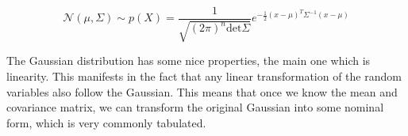 {
    \begin{equation}
        \mathcal{N}(\mu,\Sigma) \sim p(X) = \frac{1}{\sqrt{(2\pi)^{n}\text{det}\Sigma}}e^{-\frac{1}{2}(x-\mu)^{T}\Sigma^{-1}(x-\mu)}
    \end{equation}

}
The Gaussian distribution has some nice properties, the main one which is linearity. This manifests in the fact that any linear transformation of the random variables also follow the Gaussian. This means that once we know the mean and covariance matrix, we can transform the original Gaussian into some nominal form, which is very commonly tabulated.
